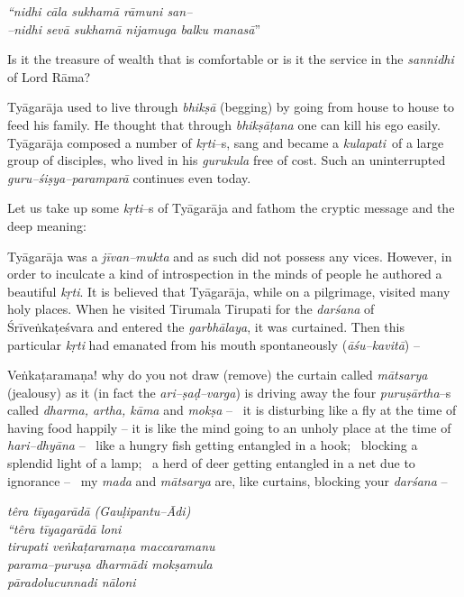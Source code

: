 \begin{myquote}
\textit{“nidhi cāla sukhamā rāmuni san–}\\\textit{–nidhi sevā sukhamā nijamuga balku manasā}”
\end{myquote}

Is it the treasure of wealth that is comfortable or is it the service in the \textit{sannidhi} of Lord Rāma?

Tyāgarāja used to live through \textit{bhikṣā} (begging) by going from house to house to feed his family. He thought that through \textit{bhikṣāṭana} one can kill his ego easily. Tyāgarāja composed a number of \textit{kṛti}–s, sang and became a \textit{kulapati} of a large group of disciples, who lived in his \textit{gurukula} free of cost. Such an uninterrupted \textit{guru–śiṣya–paramparā} continues even today. 

Let us take up some \textit{kṛti}–s of Tyāgarāja and fathom the cryptic message and the deep meaning: 

Tyāgarāja was a \textit{jīvan–mukta} and as such did not possess any vices. However, in order to inculcate a kind of introspection in the minds of people he authored a beautiful \textit{kṛti}. It is believed that Tyāgarāja, while on a pilgrimage, visited many holy places. When he visited Tirumala Tirupati for the \textit{darśana} of Śrīveṅkaṭeśvara and entered the \textit{garbhālaya}, it was curtained. Then this particular \textit{kṛti} had emanated from his mouth spontaneously (\textit{āśu–kavitā}) –

Veṅkaṭaramaṇa! why do you not draw (remove) the curtain called \textit{mātsarya} (jealousy) as it (in fact the \textit{ari–ṣaḍ–varga}) is driving away the four \textit{puruṣārtha}–s called \textit{dharma, artha, kāma} and \textit{mokṣa} –  it is disturbing like a fly at the time of having food happily – it is like the mind going to an unholy place at the time of \textit{hari–dhyāna} –  like a hungry fish getting entangled in a hook;  blocking a splendid light of a lamp;  a herd of deer getting entangled in a net due to ignorance –  my \textit{mada} and \textit{mātsarya} are, like curtains, blocking your \textit{darśana} –  

\begin{myquote}
\textit{têra tīyagarādā (Gauḷipantu–Ādi)}\\\textit{“têra tīyagarādā loni}\\\textit{tirupati veṅkaṭaramaṇa maccaramanu}\\\textit{parama–puruṣa dharmādi mokṣamula}\\\textit{pāradolucunnadi nāloni}
\end{myquote}

